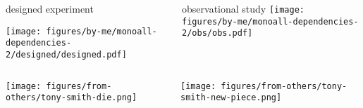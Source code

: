 \documentclass{beamer}
\newcommand{\platefigscale}[0]{0.7}
\begin{document}
\begin{frame}[t, plain]
\begin{columns}[t]
\begin{column}{0.5\textwidth}
designed experiment

\texttt{[image: figures/by-me/monoall-dependencies-2/designed/designed.pdf]}

\end{column}

\begin{column}{0.5\textwidth}
observational study
\texttt{[image: figures/by-me/monoall-dependencies-2/obs/obs.pdf]}
\end{column}
\end{columns}
\vfill

\begin{columns}[t]
\begin{column}{0.5\textwidth}

\texttt{[image: figures/from-others/tony-smith-die.png]}
\end{column}

\begin{column}{0.5\textwidth}

\texttt{[image: figures/from-others/tony-smith-new-piece.png]}
\end{column}
\end{columns}
\end{frame}

\end{document}
